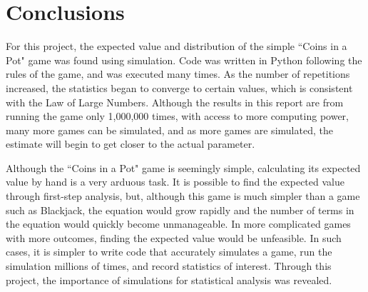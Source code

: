 \section{Conclusions}

For this project, the expected value and distribution of the simple ``Coins in a Pot" game was found using simulation. Code was written in Python following the rules of the game, and was executed many times. As the number of repetitions increased, the statistics began to converge to certain values, which is consistent with the Law of Large Numbers. Although the results in this report are from running the game only 1,000,000 times, with access to more computing power, many more games can be simulated, and as more games are simulated, the estimate will begin to get closer to the actual parameter.

Although the ``Coins in a Pot" game is seemingly simple, calculating its expected value by hand is a very arduous task. It is possible to find the expected value through first-step analysis, but, although this game is much simpler than a game such as Blackjack, the equation would grow rapidly and the number of terms in the equation would quickly become unmanageable. In more complicated games with more outcomes, finding the expected value would be unfeasible. In such cases, it is simpler to write code that accurately simulates a game, run the simulation millions of times, and record statistics of interest. Through this project, the importance of simulations for statistical analysis was revealed.

